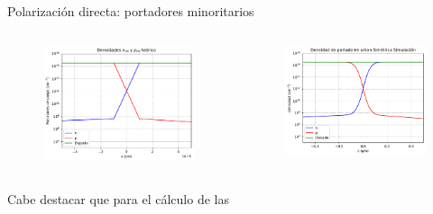 \documentclass[aspectratio=169,xcolor=dvipsnames]{beamer}
\begin{document}
\begin{frame}{Polarización directa: portadores minoritarios}
    \begin{columns}
        \begin{column}{0.5\textwidth}
            \begin{figure}
                \includegraphics[width=0.90\linewidth]{Teorico/Densidad_portadores_directa_cortada.pdf}
            \end{figure}
        \end{column}
        \begin{column}{0.5\textwidth}
            \begin{figure}
                \includegraphics[width=0.90\linewidth]{Directa/Densidad_portadores_directa_cortada.pdf}
            \end{figure}
        \end{column}
        \end{columns}
        Cabe destacar que para el cálculo de las 
\end{frame}
\end{document}
